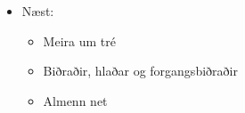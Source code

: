 \documentclass{beamer}
\begin{document}
\begin{frame}
\begin{itemize}
 \item Næst:
 \begin{itemize}
  \item Meira um tré
  \item Biðraðir, hlaðar og forgangsbiðraðir
  \item Almenn net
 \end{itemize}
\end{itemize}
\end{frame}
\end{document}
